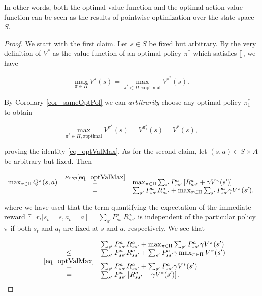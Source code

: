 \documentclass[11pt]{article} %
\begin{document}
In other words, both the optimal value function and the optimal action-value function can be seen as the results of pointwise optimization over the state space $S$.

\begin{proof}
	We start with the first claim. Let $s \in S$ be fixed but arbitrary. By the very definition of $V^*$ as the value function of an optimal policy $\pi^*$ which satisfies \ref{}, we have

	\begin{equation}
		\max_{\pi \in \Pi} V^{\pi}(s) = \max_{\pi^* \in \Pi, \pi \text{optimal}} V^{\pi^*}(s).
	\end{equation}

	By Corollary \ref{cor_sameOptPol} we can \textit{arbitrarily} choose any optimal policy $\pi^*_1$ to obtain

	\begin{equation}
		\max_{\pi^* \in \Pi, \pi \text{optimal}} V^{\pi^*}(s) = V^{\pi^*_1}(s) = V^*(s),
	\end{equation}

	proving the identity \ref{eq_optValMax}. As for the second claim, let $(s,a) \in S \times A$ be arbitrary but fixed. Then

	\begin{equation}
		\begin{array}{rcl}
		\max_{\pi \in \Pi}Q^{\pi}(s,a) & \overset{Prop \ref{eq_optValMax}}{=} & \max_{\pi \in \Pi} \sum_{s'} P_{ss'}^a \left[ R_{ss'}^a + \gamma V^{\pi}(s') \right] \\
			& = & \sum_{s'} P_{ss'}^a R_{ss'}^a + \max_{\pi \in \Pi} \sum_{s'} P_{ss'}^a \gamma V^{\pi}(s').
		\end{array}
	\end{equation}

	where we have used that the term quantifying the expectation of the immediate reward $\mathbb{E}[r_t| s_t = s, a_t = a] = \sum_{s'} P_{ss'}^a R_{ss'}^a$ is independent of the particular policy $\pi$ if both $s_t$ and $a_t$ are fixed at $s$ and $a$, respectively. We see that

	\begin{equation}
		\begin{array}{rcl}
			& & \sum_{s'} P_{ss'}^a R_{ss'}^a + \max_{\pi \in \Pi} \sum_{s'} P_{ss'}^a \gamma V^{\pi}(s') \\
			& \le & \sum_{s'} P_{ss'}^a R_{ss'}^a + \sum_{s'} P_{ss'}^a \gamma  \max_{\pi \in \Pi} V^{\pi}(s') \\
			& \overset{\ref{eq_optValMax}}{=} & \sum_{s'} P_{ss'}^a R_{ss'}^a + \sum_{s'} P_{ss'}^a \gamma V^*(s') \\
			& = & \sum_{s'} P_{ss'}^a \left[ R_{ss'}^a + \gamma V^*(s') \right]. \\
		\end{array}
	\end{equation}


\end{proof}
\end{document}
